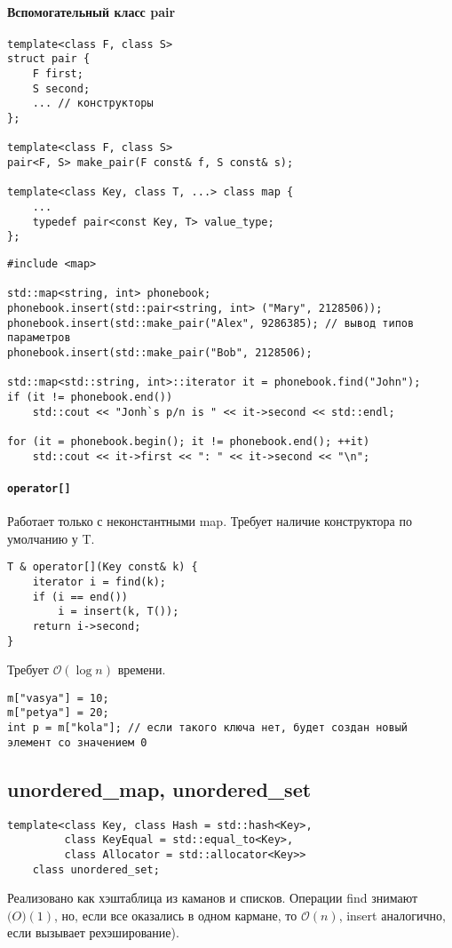\paragraph{Вспомогательный класс pair}
\begin{verbatim}
template<class F, class S>
struct pair {
	F first;
	S second;
	... // конструкторы
};

template<class F, class S>
pair<F, S> make_pair(F const& f, S const& s);

template<class Key, class T, ...> class map {
	...
	typedef pair<const Key, T> value_type;
};
\end{verbatim}
\begin{verbatim}
#include <map>

std::map<string, int> phonebook;
phonebook.insert(std::pair<string, int> ("Mary", 2128506));
phonebook.insert(std::make_pair("Alex", 9286385); // вывод типов параметров
phonebook.insert(std::make_pair("Bob", 2128506);

std::map<std::string, int>::iterator it = phonebook.find("John");
if (it != phonebook.end()) 
    std::cout << "Jonh`s p/n is " << it->second << std::endl;

for (it = phonebook.begin(); it != phonebook.end(); ++it)
    std::cout << it->first << ": " << it->second << "\n";
\end{verbatim}

\paragraph{\texttt{operator[]}}
Работает только с неконстантными map.
Требует наличие конструктора по умолчанию у T.
\begin{verbatim}
T & operator[](Key const& k) {
    iterator i = find(k);
	if (i == end())
	    i = insert(k, T());
    return i->second;
}
\end{verbatim}
Требует $ \mathcal{O}(\log n)$ времени.
\begin{verbatim}
m["vasya"] = 10;
m["petya"] = 20;
int p = m["kola"]; // если такого ключа нет, будет создан новый элемент со значением 0
\end{verbatim}
\subsection{unordered\_map, unordered\_set}
\begin{verbatim}
template<class Key, class Hash = std::hash<Key>,
		 class KeyEqual = std::equal_to<Key>,
		 class Allocator = std::allocator<Key>>
	class unordered_set;
\end{verbatim}
Реализовано как хэштаблица из каманов и списков. Операции find знимают $ \mathcal(O)(1)$, но, если все оказались в одном кармане, то  $ \mathcal{O}(n)$, insert аналогично, если вызывает рехэширование).

